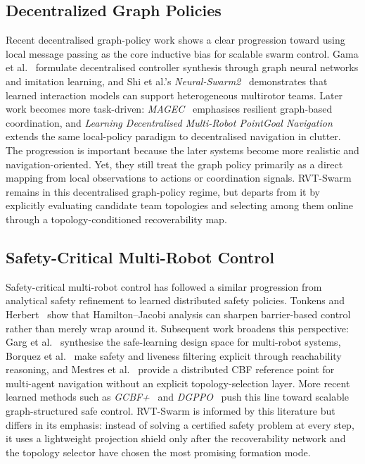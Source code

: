 \documentclass{ieeeaccess}
\begin{document}
\subsection{Decentralized Graph Policies}
Recent decentralised graph-policy work shows a clear progression toward using local message passing as the core inductive bias for scalable swarm control. Gama et al.~\cite{gama2022gnn_synthesis} formulate decentralised controller synthesis through graph neural networks and imitation learning, and Shi et al.'s \emph{Neural-Swarm2}~\cite{shi2022neural_swarm2} demonstrates that learned interaction models can support heterogeneous multirotor teams. Later work becomes more task-driven: \emph{MAGEC}~\cite{goeckner2024magec} emphasises resilient graph-based coordination, and \emph{Learning Decentralised Multi-Robot PointGoal Navigation}~\cite{soualhi2025pointgoal} extends the same local-policy paradigm to decentralised navigation in clutter. The progression is important because the later systems become more realistic and navigation-oriented. Yet, they still treat the graph policy primarily as a direct mapping from local observations to actions or coordination signals. RVT-Swarm remains in this decentralised graph-policy regime, but departs from it by explicitly evaluating candidate team topologies and selecting among them online through a topology-conditioned recoverability map.

\subsection{Safety-Critical Multi-Robot Control}
Safety-critical multi-robot control has followed a similar progression from analytical safety refinement to learned distributed safety policies. Tonkens and Herbert~\cite{tonkens2022refining_cbf_hj} show that Hamilton--Jacobi analysis can sharpen barrier-based control rather than merely wrap around it. Subsequent work broadens this perspective: Garg et al.~\cite{garg2024safe_multirobot_review} synthesise the safe-learning design space for multi-robot systems, Borquez et al.~\cite{borquez2024hj_filtering} make safety and liveness filtering explicit through reachability reasoning, and Mestres et al.~\cite{mestres2024distributed_safe_navigation} provide a distributed CBF reference point for multi-agent navigation without an explicit topology-selection layer. More recent learned methods such as \emph{GCBF+}~\cite{zhang2025gcbf_plus} and \emph{DGPPO}~\cite{zhang2025dgppo} push this line toward scalable graph-structured safe control. RVT-Swarm is informed by this literature but differs in its emphasis: instead of solving a certified safety problem at every step, it uses a lightweight projection shield only after the recoverability network and the topology selector have chosen the most promising formation mode.
\end{document}
